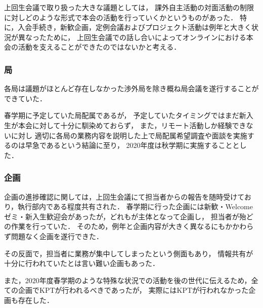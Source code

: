 上回生会議で取り扱った大きな議題としては，
課外自主活動の対面活動の制限に対しどのような形式で本会の活動を行っていくかというものがあった．
特に，入会手続き，新歓企画，定例会議およびプロジェクト活動は例年と大きく状況が異なったために，
上回生会議での話し合いによってオンラインにおける本会の活動を支えることができたのではないかと考える．

\subsubsection*{局}
各局は議題がほとんど存在しなかった渉外局を除き概ね局会議を遂行することができていた．

春学期に予定していた局配属であるが，
予定していたタイミングではまだ新入生が本会に対して十分に馴染めておらず，
また，リモート活動しか経験できない\firstGrade{}に対し
適切に各局の業務内容を説明した上で局配属希望調査や面談を実施するのは早急であるという結論に至り，
2020年度は秋学期に実施することとした．


\subsubsection*{企画}
企画の進捗確認に関しては，上回生会議にて担当者からの報告を随時受けており，執行部内である程度共有された．
春学期に行った企画には新歓・Welcomeゼミ・新入生歓迎会があったが，どれも\secondGrade{}が主体となって企画し，
担当者が殆どの作業を行っていた．
そのため，例年と企画内容が大きく異なるにもかかわらず問題なく企画を遂行できた．

その反面で，担当者に業務が集中してしまったという側面もあり，
情報共有が十分に行われていたとは言い難い企画もあった．

また，2020年度春学期のような特殊な状況での活動を後の世代に伝えるため，全ての企画でKPTが行われるべきであったが，
実際にはKPTが行われなかった企画も存在した．

